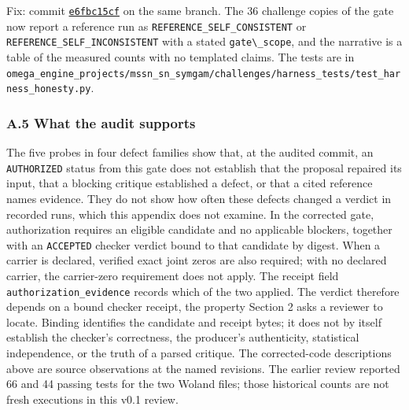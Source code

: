 \documentclass[
  11pt,
]{article}
\newcommand{\passthrough}[1]{#1}
\begin{document}
Fix: commit
\href{https://github.com/dbccpage/the_symbol_game/commit/e6fbc15cf011121597a82a1d199626063bedf7c0}{\passthrough{\lstinline!e6fbc15cf!}}
on the same branch. The 36 challenge copies of the gate now report a
reference run as \nolinkurl{REFERENCE_SELF_CONSISTENT} or
\nolinkurl{REFERENCE_SELF_INCONSISTENT} with a stated
\passthrough{\lstinline!gate\_scope!}, and the narrative is a table of
the measured counts with no templated claims. The tests are in
\nolinkurl{omega_engine_projects/mssn_sn_symgam/challenges/harness_tests/test_harness_honesty.py}.

\subsubsection{A.5 What the audit
supports}\label{a.5-what-the-audit-supports}

The five probes in four defect families show that, at the audited
commit, an \passthrough{\lstinline!AUTHORIZED!} status from this gate
does not establish that the proposal repaired its input, that a blocking
critique established a defect, or that a cited reference names evidence.
They do not show how often these defects changed a verdict in recorded
runs, which this appendix does not examine. In the corrected gate,
authorization requires an eligible candidate and no applicable blockers,
together with an \passthrough{\lstinline!ACCEPTED!} checker verdict
bound to that candidate by digest. When a carrier is declared, verified
exact joint zeros are also required; with no declared carrier, the
carrier-zero requirement does not apply. The receipt field
\nolinkurl{authorization_evidence} records which of the two applied. The
verdict therefore depends on a bound checker receipt, the property
Section 2 asks a reviewer to locate. Binding identifies the candidate
and receipt bytes; it does not by itself establish the checker's
correctness, the producer's authenticity, statistical independence, or
the truth of a parsed critique. The corrected-code descriptions above
are source observations at the named revisions. The earlier review
reported 66 and 44 passing tests for the two Woland files; those
historical counts are not fresh executions in this v0.1 review.
\end{document}
